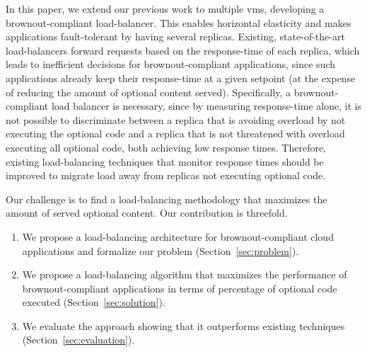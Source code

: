 In this paper, we extend our previous work to multiple \acp{vm},
developing a brownout-compliant load-balancer. This enables horizontal
elasticity and makes applications fault-tolerant by having several
replicas. Existing, state-of-the-art load-balancers forward requests
based on the response-time of each replica, which leads to inefficient
decisions for brownout-compliant applications, since such applications
already keep their response-time at a given setpoint (at the expense
of reducing the amount of optional content served). Specifically, a
brownout-compliant load balancer is necessary, since by measuring
response-time alone, it is not possible to discriminate between a
replica that is avoiding overload by not executing the optional code
and a replica that is not threatened with overload executing all
optional code, both achieving low response times.  Therefore, existing
load-balancing techniques that monitor response times should be
improved to migrate load away from replicas not executing optional
code.

Our challenge is to find a load-balancing methodology that maximizes
the amount of served optional content. Our contribution is threefold.
\begin{enumerate}
\item We propose a load-balancing architecture for brownout-compliant
  cloud applications and formalize our problem
  (Section~\ref{sec:problem}).
\item We propose a load-balancing algorithm that maximizes the
  performance of brownout-compliant applications in terms of
  percentage of optional code executed (Section~\ref{sec:solution}).
\item We evaluate the approach showing that it outperforms existing
  techniques (Section~\ref{sec:evaluation}).
\end{enumerate}

